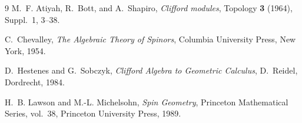 \documentclass[11pt]{article}
\theoremstyle{definition}
\begin{document}
\begin{thebibliography}{9}
M.~F. Atiyah, R.~Bott, and A.~Shapiro, \emph{Clifford modules}, Topology \textbf{3} (1964), Suppl.~1, 3--38.

C.~Chevalley, \emph{The Algebraic Theory of Spinors}, Columbia University Press, New York, 1954.

D.~Hestenes and G.~Sobczyk, \emph{Clifford Algebra to Geometric Calculus}, D.~Reidel, Dordrecht, 1984.

H.~B. Lawson and M.-L. Michelsohn, \emph{Spin Geometry}, Princeton Mathematical Series, vol.~38, Princeton University Press, 1989.
\end{thebibliography}
\end{document}

